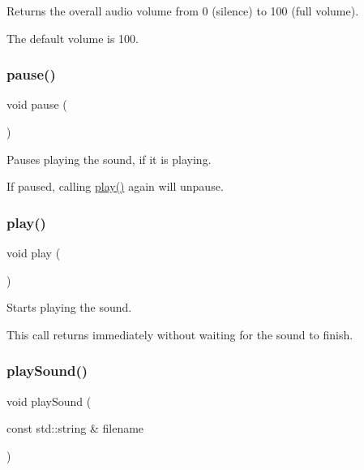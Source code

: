 Returns the overall audio volume from 0 (silence) to 100 (full volume). 

The default volume is 100. \mbox{\label{classsgl_1_1GSound_a7167f5c196fc5e167bfabde1a730e81d}} 
\subsubsection{\texorpdfstring{pause()}{pause()}}
{\footnotesize\ttfamily void pause (\begin{DoxyParamCaption}{ }\end{DoxyParamCaption})\hspace{0.3cm}{\ttfamily [static]}}



Pauses playing the sound, if it is playing. 

If paused, calling \mbox{\hyperlink{classsgl_1_1GSound_a6d58098c6cf63c241ed03bc797256bb1}{play()}} again will unpause. \mbox{\label{classsgl_1_1GSound_a6d58098c6cf63c241ed03bc797256bb1}} 
\subsubsection{\texorpdfstring{play()}{play()}}
{\footnotesize\ttfamily void play (\begin{DoxyParamCaption}{ }\end{DoxyParamCaption})}



Starts playing the sound. 

This call returns immediately without waiting for the sound to finish. \mbox{\label{classsgl_1_1GSound_a33b24517799bad56a19cfe26b3f962ae}} 
\subsubsection{\texorpdfstring{play\+Sound()}{playSound()}}
{\footnotesize\ttfamily void play\+Sound (\begin{DoxyParamCaption}\item[{const std\+::string \&}]{filename }\end{DoxyParamCaption})\hspace{0.3cm}{\ttfamily [static]}}



